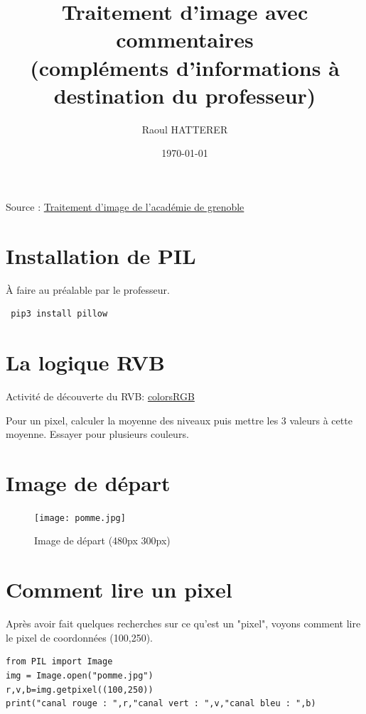 \documentclass[11pt]{article}
\author{Raoul HATTERER}
\date{\today}
\title{Traitement d'image avec commentaires\\\medskip
\large (compléments d'informations à destination du professeur)}
\begin{document}
\maketitle
\tableofcontents

Source : \href{http://www.ac-grenoble.fr/disciplines/informatiquelycee/n\_site/snt\_photo\_transImg.html}{Traitement d'image de l'académie de grenoble}

\section{Installation de PIL}
\label{sec:org729df9a}

À faire au préalable par le professeur.

\begin{verbatim}
 pip3 install pillow
\end{verbatim}

\section{La logique RVB}
\label{sec:org5c1f826}

Activité de découverte du RVB: \href{https://www.w3schools.com/colors/colors\_rgb.asp}{colorsRGB}

Pour un pixel, calculer la moyenne des niveaux puis mettre les 3 valeurs à cette moyenne. Essayer pour plusieurs couleurs.

\section{Image de départ}
\label{sec:orgd15b99e}

\begin{figure}[htbp]
\centering
\texttt{[image: pomme.jpg]}
\caption{Image de départ (480px \texttimes{} 300px)}
\end{figure}


\section{Comment lire un pixel}
\label{sec:orgad74a49}

Après avoir fait quelques recherches sur ce qu'est un "pixel", voyons comment lire le pixel de coordonnées (100,250).

\begin{verbatim}
from PIL import Image
img = Image.open("pomme.jpg")
r,v,b=img.getpixel((100,250))
print("canal rouge : ",r,"canal vert : ",v,"canal bleu : ",b)
\end{verbatim}
\end{document}
